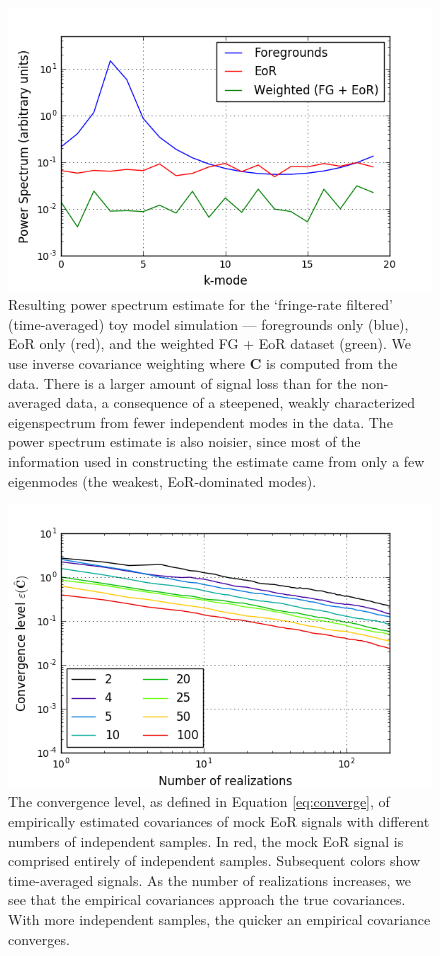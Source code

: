 \documentclass[preprint2,numberedappendix,tighten]{aastex6}  %
\begin{document}
\begin{figure}
	\centering
	\includegraphics[trim={0cm 0cm 0.3cm 0.2cm},clip,width=\columnwidth]{plots/toy_sigloss7.png}
	\caption{Resulting power spectrum estimate for the `fringe-rate filtered' (time-averaged) toy model simulation --- foregrounds only (blue), 
EoR only (red), and the weighted FG + EoR dataset (green). We use inverse covariance weighting where $\textbf{C}$ is 
computed from the data. There is a larger amount of signal loss than for the non-averaged data, a consequence of a 
steepened, weakly characterized eigenspectrum from fewer independent modes in the data. The power spectrum 
estimate is also noisier, since most of the information used in constructing the estimate came from only a few eigenmodes (the 
weakest, EoR-dominated modes).}
	\label{fig:toy_sigloss7}
\end{figure}

\begin{figure}
	\centering
	\includegraphics[trim={0cm 0cm 0.3cm 0.2cm},clip,width=\columnwidth]{plots/toy_sigloss16.png}
	\caption{The convergence level, as defined in Equation \eqref{eq:converge}, of empirically estimated covariances of mock EoR signals with different numbers of independent samples. In red, the mock EoR signal is comprised entirely of independent samples. Subsequent colors show time-averaged signals. As the number of realizations increases, we see that the empirical covariances approach the true covariances. With more independent samples, the quicker an empirical covariance converges.}
	\label{fig:toy_sigloss16}
\end{figure}
\end{document}
